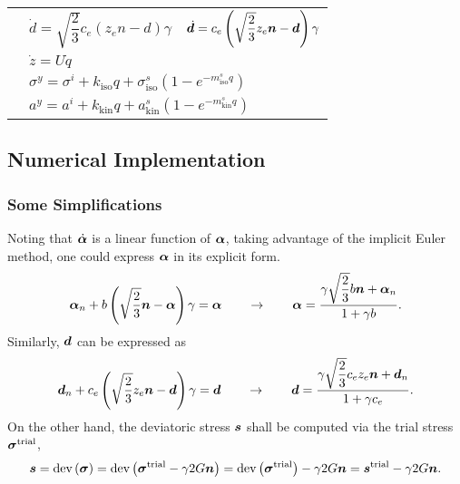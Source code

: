 \begin{table}[htb]
\begin{tabular}{rll}
                           & $\dot{d}=\sqrt{\dfrac{2}{3}}c_e\left(z_en-d\right)\gamma$                                                    & $\dot{\bm{d}}=c_e\left(\sqrt{\dfrac{2}{3}}z_e\bm{n}-\bm{d}\right)\gamma$    \\
                           & \multicolumn{2}{l}{$\dot{z}=U\dot{q}$}                                                                                                                                            \\
                           & \multicolumn{2}{l}{$\sigma^y=\sigma^i+k_\text{iso}q+\sigma^s_\text{iso}\left(1-e^{-m^s_\text{iso}q}\right)$}                                                                      \\
                           & \multicolumn{2}{l}{$a^y=a^i+k_\text{kin}q+a^s_\text{kin}\left(1-e^{-m^s_\text{kin}q}\right)$}                                                                                     \\\bottomrule
    \end{tabular}
\end{table}
\subsection{Numerical Implementation}
\subsubsection{Some Simplifications}
Noting that $\dot{\bm{\alpha}}$ is a linear function of $\bm{\alpha}$, taking advantage of the implicit Euler method, one could express $\bm{\alpha}$ in its explicit form.
\begin{gather}\label{eq:explicit_alpha}
    \bm{\alpha}_n+b\left(\sqrt{\dfrac{2}{3}}\bm{n}-\bm{\alpha}\right)\gamma=\bm{\alpha}\qquad\rightarrow\qquad
    \bm{\alpha}=\dfrac{\gamma\sqrt{\dfrac{2}{3}}b\bm{n}+\bm{\alpha}_n}{1+\gamma{}b}.
    \end{gather}
    Similarly, $\bm{d}$ can be expressed as
    \begin{gather}\label{eq:explicit_d}
        \bm{d}_n+c_e\left(\sqrt{\dfrac{2}{3}}z_e\bm{n}-\bm{d}\right)\gamma=\bm{d}\qquad\rightarrow\qquad\bm{d}=\dfrac{\gamma{}\sqrt{\dfrac{2}{3}}c_ez_e\bm{n}+\bm{d}_n}{1+\gamma{}c_e}.
    \end{gather}
    On the other hand, the deviatoric stress $\bm{s}$ shall be computed via the trial stress $\bm{\sigma}^\text{trial}$,
    \begin{gather}
    \bm{s}=\text{dev}\left(\bm{\sigma}\right)=\text{dev}\left(\bm{\sigma}^\text{trial}-\gamma2G\bm{n}\right)=\text{dev}\left(\bm{\sigma}^\text{trial}\right)-\gamma2G\bm{n}=\bm{s}^\text{trial}-\gamma2G\bm{n}.
\end{gather}

